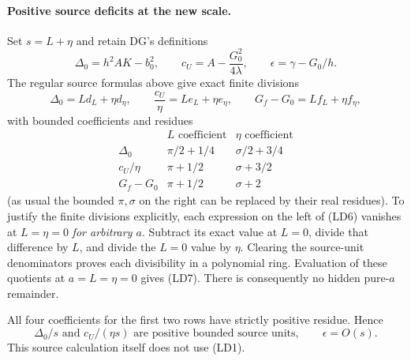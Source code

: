 \paragraph{Positive source deficits at the new scale.}
Set $s=L+\eta$ and retain DG's definitions
\[
 \Delta_0=h^2AK-b_0^2,
 \qquad c_U=A-\frac{G_0^2}{4\lambda},
 \qquad\epsilon=\gamma-G_0/h.
\]
The regular source formulas above give exact finite divisions
\[
 \Delta_0=Ld_L+\eta d_\eta,\qquad
 \frac{c_U}{\eta}=Le_L+\eta e_\eta,\qquad
 G_f-G_0=Lf_L+\eta f_\eta,                           \tag{LD6}
\]
with bounded coefficients and residues
\[
\begin{array}{c|cc}
 &L\text{ coefficient}&\eta\text{ coefficient}\\\hline
 \Delta_0&\pi/2+1/4&\sigma/2+3/4\\
 c_U/\eta&\pi+1/2&\sigma+3/2\\
 G_f-G_0&\pi+1/2&\sigma+2
\end{array}                                                     \tag{LD7}
\]
(as usual the bounded $\pi,\sigma$ on the right can be replaced
by their real residues). To justify the finite divisions explicitly,
each expression on the left of (LD6) vanishes at $L=\eta=0$
\emph{for arbitrary $a$}. Subtract its exact value at $L=0$, divide
that difference by $L$, and divide the $L=0$ value by $\eta$.
Clearing the source-unit denominators proves each divisibility in a
polynomial ring. Evaluation of these quotients at $a=L=\eta=0$
gives (LD7). There is consequently no hidden pure-$a$ remainder.

All four coefficients for the first two rows have strictly positive
residue. Hence
\[
 \Delta_0/s\text{ and }c_U/(\eta s)
       \text{ are positive bounded source units},\qquad
 \epsilon=O(s).                                      \tag{LD8}
\]
This source calculation itself does not use (LD1).

